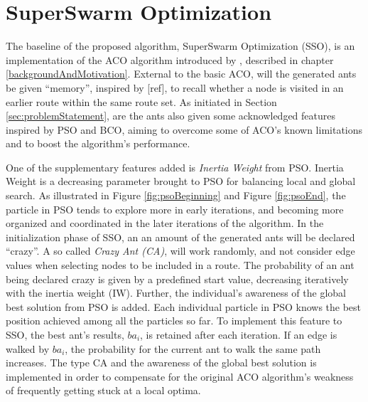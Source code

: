 \section{SuperSwarm Optimization}
\label{section:methodDescription}

The baseline of the proposed algorithm, SuperSwarm Optimization (SSO), is an implementation of the ACO algorithm introduced by \citet{nanda11}, described in chapter \vref{backgroundAndMotivation}. External to the basic ACO, will the generated ants be given ``memory'', inspired by [ref], to recall whether a node is visited in an earlier route within the same route set. As initiated in Section \vref{sec:problemStatement}, are the ants also given some acknowledged features inspired by PSO and BCO, aiming to overcome some of ACO's known limitations and to boost the algorithm's performance. 

One of the supplementary features added is \textit{Inertia Weight} from PSO. Inertia Weight is a decreasing parameter brought to PSO for balancing local and global search. As illustrated in Figure \vref{fig:psoBeginning} and Figure \vref{fig:psoEnd}, the particle in PSO tends to explore more in early iterations, and becoming more organized and coordinated in the later iterations of the algorithm. In the initialization phase of SSO, an an amount of the generated ants will be declared ``crazy''. A so called \textit{Crazy Ant (CA)}, will work randomly, and not consider edge values when selecting nodes to be included in a route. The probability of an ant being declared crazy is given by a predefined start value, decreasing iteratively with the inertia weight (IW). %
Further, the individual's awareness of the global best solution from PSO is added. Each individual particle in PSO knows the best position achieved among all the particles so far. To implement this feature to SSO, the best ant's results, $ba_i$, is retained after each iteration. If an edge is walked by $ba_i$, the probability for the current ant to walk the same path increases. The type CA and the awareness of the global best solution is implemented in order to compensate for the original ACO algorithm's weakness of frequently getting stuck at a local optima. %

